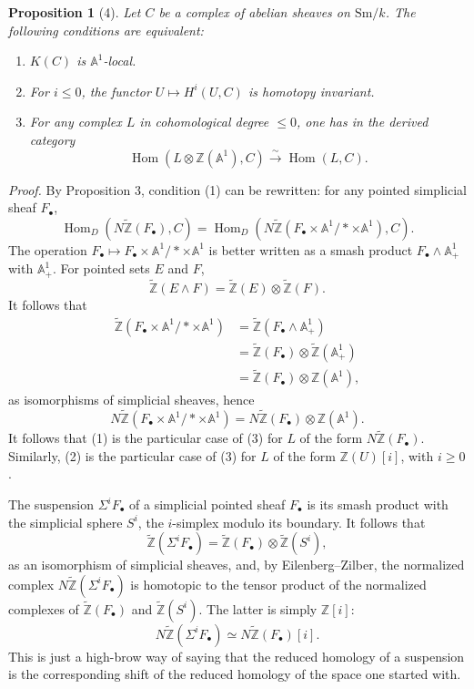 \documentclass[11pt]{article}
\newcommand{\Aone}{\mathbb A^1}
\newcommand{\Z}{\mathbb Z}
\newcommand{\Sm}{\mathrm{Sm}}
\newcommand{\Hom}{\operatorname{Hom}}
\newcommand{\pt}{*}
\newcommand{\ZZ}{\widetilde{\Z}}
\theoremstyle{deligne}
\newtheorem*{proposition*}{Proposition}
\begin{document}
\begin{proposition*}[4]
Let \(C\) be a complex of abelian sheaves on \(\Sm/k\). The following conditions are equivalent:
\begin{enumerate}[label=\arabic*.]
\item \(K(C)\) is \(\Aone\)-local.
\item For \(i\le0\), the functor \(U\mapsto H^i(U,C)\) is homotopy invariant.
\item For any complex \(L\) in cohomological degree \(\le0\), one has in the derived category
\[
  \Hom(L\otimes\Z(\Aone),C)\overset{\sim}{\longrightarrow}\Hom(L,C).
\]
\end{enumerate}
\end{proposition*}

\noindent\textit{Proof.} By Proposition 3, condition (1) can be rewritten: for any pointed simplicial sheaf \(F_\bullet\),
\[
  \Hom_D(N\ZZ(F_\bullet),C)=
  \Hom_D(N\ZZ(F_\bullet\times\Aone/\pt\times\Aone),C).
\]
The operation \(F_\bullet\mapsto F_\bullet\times\Aone/\pt\times\Aone\) is better written as a smash product \(F_\bullet\wedge\Aone_+\) with \(\Aone_+\). For pointed sets \(E\) and \(F\),
\[
  \ZZ(E\wedge F)=\ZZ(E)\otimes\ZZ(F).
\]
It follows that
\[
\begin{aligned}
\ZZ(F_\bullet\times\Aone/\pt\times\Aone)
&=\ZZ(F_\bullet\wedge\Aone_+)        \\
&=\ZZ(F_\bullet)\otimes\ZZ(\Aone_+) \\
&=\ZZ(F_\bullet)\otimes\Z(\Aone),
\end{aligned}
\]
as isomorphisms of simplicial sheaves, hence
\[
  N\ZZ(F_\bullet\times\Aone/\pt\times\Aone)
  =N\ZZ(F_\bullet)\otimes\Z(\Aone).
\]
It follows that (1) is the particular case of (3) for \(L\) of the form \(N\ZZ(F_\bullet)\). Similarly, (2) is the particular case of (3) for \(L\) of the form \(\Z(U)[i]\), with \(i\ge0\).

The suspension \(\Sigma^iF_\bullet\) of a simplicial pointed sheaf \(F_\bullet\) is its smash product with the simplicial sphere \(S^i\), the \(i\)-simplex modulo its boundary. It follows that
\[
  \ZZ(\Sigma^iF_\bullet)=\ZZ(F_\bullet)\otimes\ZZ(S^i),
\]
as an isomorphism of simplicial sheaves, and, by Eilenberg--Zilber, the normalized complex \(N\ZZ(\Sigma^iF_\bullet)\) is homotopic to the tensor product of the normalized complexes of \(\ZZ(F_\bullet)\) and \(\ZZ(S^i)\). The latter is simply \(\Z[i]\):
\[
  N\ZZ(\Sigma^iF_\bullet)\simeq N\ZZ(F_\bullet)[i].
\]
This is just a high-brow way of saying that the reduced homology of a suspension is the corresponding shift of the reduced homology of the space one started with.
\end{document}

